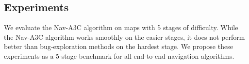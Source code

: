 \subsection{Experiments}
\label{sec:navtasks}
We evaluate the Nav-A3C algorithm on maps with 5 stages of difficulty. While the Nav-A3C algorithm works smoothly on the easier stages, it does not perform better than bug-exploration methods on the hardest stage.
We propose these experiments as a 5-stage benchmark for all end-to-end navigation algorithms.



